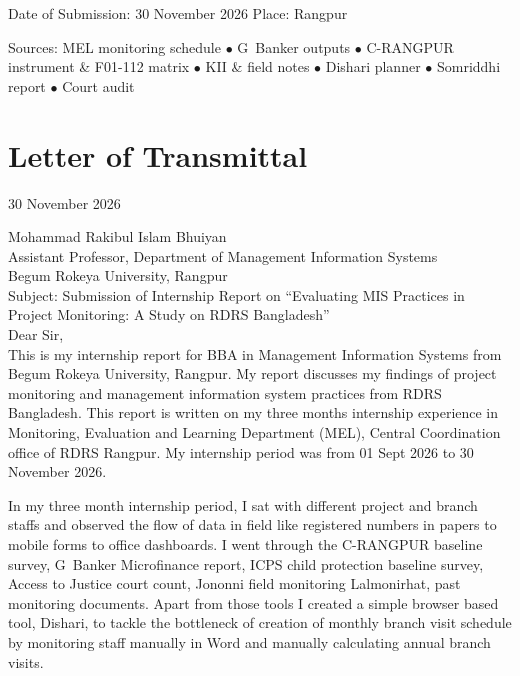\documentclass[12pt,a4paper]{report}
\begin{document}
\begin{titlepage}
\vfill
{\small\color{RDRSGrey} Date of Submission: 30 November 2026 \qquad Place: Rangpur \par}
\vspace{0.15cm}
{\scriptsize\color{RDRSMidGrey} Sources: MEL monitoring schedule \quad $\bullet$ \quad G~Banker outputs \quad $\bullet$ \quad C-RANGPUR instrument \& F01-112 matrix \quad $\bullet$ \quad KII \& field notes \quad $\bullet$ \quad Dishari planner \quad $\bullet$ \quad Somriddhi report \quad $\bullet$ \quad Court audit \par}
\end{titlepage}


\chapter*{Letter of Transmittal}
\enlargethispage{2\baselineskip}
30 November 2026\par
Mohammad Rakibul Islam Bhuiyan\\
Assistant Professor, Department of Management Information Systems\\
Begum Rokeya University, Rangpur\\[4pt]
Subject: Submission of Internship Report on ``Evaluating MIS Practices in Project Monitoring: A Study on RDRS Bangladesh''\\[4pt]
Dear Sir,\\[2pt]
This is my internship report for BBA in Management Information Systems from Begum Rokeya University, Rangpur. My report discusses my findings of project monitoring and management information system practices from RDRS Bangladesh. This report is written on my three months internship experience in Monitoring, Evaluation and Learning Department (MEL), Central Coordination office of RDRS Rangpur. My internship period was from 01 Sept 2026 to 30 November 2026.

In my three month internship period, I sat with different project and branch staffs and observed the flow of data in field like registered numbers in papers to mobile forms to office dashboards. I went through the C-RANGPUR baseline survey, G~Banker Microfinance report, ICPS child protection baseline survey, Access to Justice court count, Jononni field monitoring Lalmonirhat, past monitoring documents. Apart from those tools I created a simple browser based tool, Dishari, to tackle the bottleneck of creation of monthly branch visit schedule by monitoring staff manually in Word and manually calculating annual branch visits.
\end{document}
